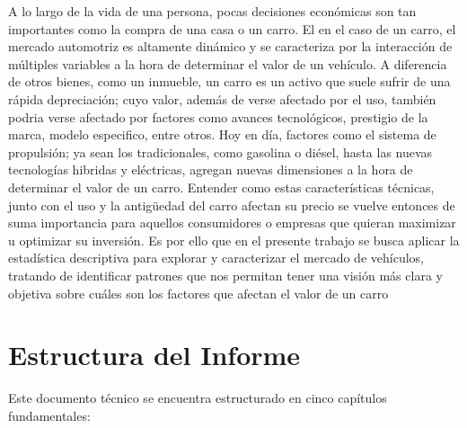 \documentclass[oneside,11pt]{Latex/Classes/PhDthesisPSnPDF}
\begin{document}
A lo largo de la vida de una persona, pocas decisiones económicas son
tan importantes como la compra de una casa o un carro. El en el caso de
un carro, el mercado automotriz es altamente dinámico y se caracteriza
por la interacción de múltiples variables a la hora de determinar el
valor de un vehículo. A diferencia de otros bienes, como un inmueble, un
carro es un activo que suele sufrir de una rápida depreciación; cuyo
valor, además de verse afectado por el uso, también podria verse
afectado por factores como avances tecnológicos, prestigio de la marca,
modelo especifico, entre otros. \newline \newline Hoy en día, factores
como el sistema de propulsión; ya sean los tradicionales, como gasolina
o diésel, hasta las nuevas tecnologías hibridas y eléctricas, agregan
nuevas dimensiones a la hora de determinar el valor de un carro.
Entender como estas características técnicas, junto con el uso y la
antigüedad del carro afectan su precio se vuelve entonces de suma
importancia para aquellos consumidores o empresas que quieran maximizar
u optimizar su inversión. \newline \newline Es por ello que en el
presente trabajo se busca aplicar la estadística descriptiva para
explorar y caracterizar el mercado de vehículos, tratando de identificar
patrones que nos permitan tener una visión más clara y objetiva sobre
cuáles son los factores que afectan el valor de un carro

\section*{Estructura del Informe}

Este documento técnico se encuentra estructurado en cinco capítulos
fundamentales:
\end{document}
